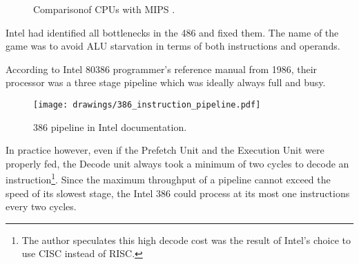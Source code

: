 \par
\begin{figure}[H]
\centering
   \caption{Comparison\protect\footnotemark of CPUs with MIPS \protect\footnotemark.}
 \end{figure}

Intel had identified all bottlenecks in the 486 and fixed them. The name of the game was to avoid ALU starvation in terms of both instructions and operands.\\
\par
{}
\par













According to Intel 80386 programmer's reference manual from 1986, their processor was a three stage pipeline which was ideally always full and busy.\\
\par
\begin{figure}[H]
\centering
\texttt{[image: drawings/386\_instruction\_pipeline.pdf]}
\caption{386 pipeline in Intel documentation.}
\end{figure}
\bigskip
\par
In practice however, even if the Prefetch Unit and the Execution Unit were properly fed, the Decode unit always took a minimum of two cycles to decode an instruction\footnote{The author speculates this high decode cost was the result of Intel's choice to use CISC instead of RISC.}. Since the maximum throughput of a pipeline cannot exceed the speed of its slowest stage, the Intel 386 could process at its most one instructions every two cycles.\\
\par

